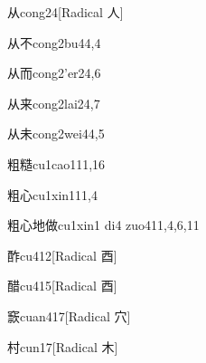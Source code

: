 \begin{verbete}{从}{cong2}{4}[Radical ⼈]
\end{verbete}

\begin{verbete}{从不}{cong2bu4}{4,4}
\end{verbete}

\begin{verbete}{从而}{cong2'er2}{4,6}
\end{verbete}

\begin{verbete}{从来}{cong2lai2}{4,7}
\end{verbete}

\begin{verbete}{从未}{cong2wei4}{4,5}
\end{verbete}

\begin{verbete}{粗糙}{cu1cao1}{11,16}
\end{verbete}

\begin{verbete}{粗心}{cu1xin1}{11,4}
\end{verbete}

\begin{verbete}{粗心地做}{cu1xin1 di4 zuo4}{11,4,6,11}
\end{verbete}

\begin{verbete}{酢}{cu4}{12}[Radical 酉]
\end{verbete}

\begin{verbete}{醋}{cu4}{15}[Radical ⾣]
\end{verbete}

\begin{verbete}{窾}{cuan4}{17}[Radical 穴]
\end{verbete}

\begin{verbete}{村}{cun1}{7}[Radical ⽊]
\end{verbete}

